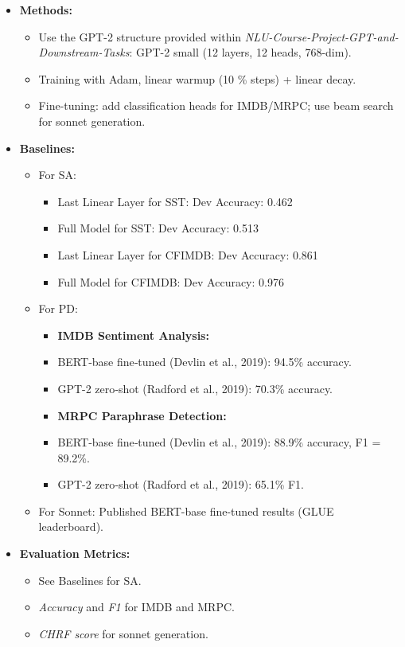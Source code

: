 \documentclass{article}
\theoremstyle{definition}
\begin{document}
\begin{itemize}
    \item \textbf{Methods:}
      \begin{itemize}
        \item Use the GPT-2 structure provided within \emph{
          NLU-Course-Project-GPT-and-Downstream-Tasks}: GPT-2 small (12 layers, 12 heads, 768-dim).
        \item Training with Adam, linear warmup (10 \% steps) + linear decay.
        \item Fine-tuning: add classification heads for IMDB/MRPC; use beam search for sonnet generation.
      \end{itemize}
  
    \item \textbf{Baselines:}
      \begin{itemize}
        \item For SA:
          \begin{itemize}
            \item Last Linear Layer for SST: Dev Accuracy: 0.462
            \item Full Model for SST: Dev Accuracy: 0.513
            \item Last Linear Layer for CFIMDB: Dev Accuracy: 0.861
            \item Full Model for CFIMDB: Dev Accuracy: 0.976
          \end{itemize}
        \item For PD:
        \begin{itemize}
          \item \textbf{IMDB Sentiment Analysis:}
              \item BERT‐base fine‐tuned (Devlin et al., 2019): 94.5\% accuracy.
              \item GPT-2 zero‐shot (Radford et al., 2019): 70.3\% accuracy.

            \item \textbf{MRPC Paraphrase Detection:}
              \item BERT‐base fine‐tuned (Devlin et al., 2019): 88.9\% accuracy, F1 = 89.2\%.
              \item GPT-2 zero‐shot (Radford et al., 2019): 65.1\% F1.
        \end{itemize}
        \item For Sonnet: Published BERT-base fine-tuned results (GLUE leaderboard).
      \end{itemize}
  
    \item \textbf{Evaluation Metrics:}
      \begin{itemize}
        \item See Baselines for SA.
        \item \emph{Accuracy} and \emph{F1} for IMDB and MRPC.
        \item \emph{CHRF score} for sonnet generation.
      \end{itemize}
  \end{itemize}
\end{document}
